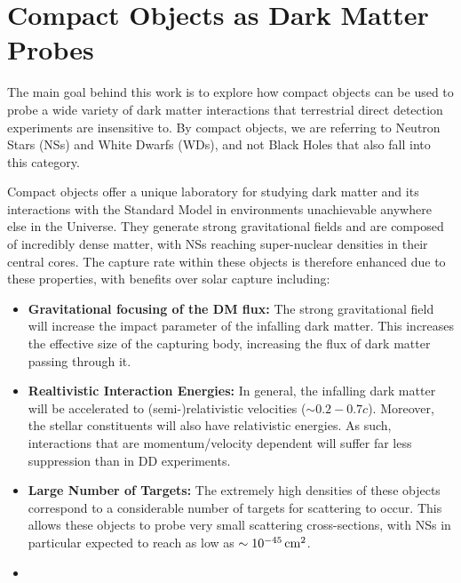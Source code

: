 \section{Compact Objects as Dark Matter Probes}

The main goal behind this work is to explore how compact objects can be used to probe a wide variety of dark matter interactions that terrestrial direct detection experiments are insensitive to. By compact objects, we are referring to Neutron Stars (NSs) and White Dwarfs (WDs), and not Black Holes that also fall into this category.


Compact objects offer a unique laboratory for studying dark matter and its interactions with the Standard Model in environments unachievable anywhere else in the Universe. They generate strong gravitational fields and are composed of incredibly dense matter, with NSs reaching super-nuclear densities in their central cores. The capture rate within these objects is therefore enhanced due to these properties, with benefits over solar capture including:


\begin{itemize}
\item \textbf{Gravitational focusing of the DM flux:} The strong gravitational field will increase the impact parameter of the infalling dark matter. This increases the effective size of the capturing body, increasing the flux of dark matter passing through it. 

\item \textbf{Realtivistic Interaction Energies:} In general, the infalling dark matter will be accelerated to (semi-)relativistic velocities ($\sim 0.2 - 0.7 c$). Moreover, the stellar constituents will also have relativistic energies. As such, interactions that are momentum/velocity dependent will suffer far less suppression than in DD experiments. 

\item \textbf{Large Number of Targets:} The extremely high densities of these objects correspond to a considerable number of targets for scattering to occur. This allows these objects to probe very small scattering cross-sections, with NSs in particular expected to reach as low as $\sim 10^ {-45}{\rm \,cm}^2$. 

\item \textbf{}
\end{itemize}

